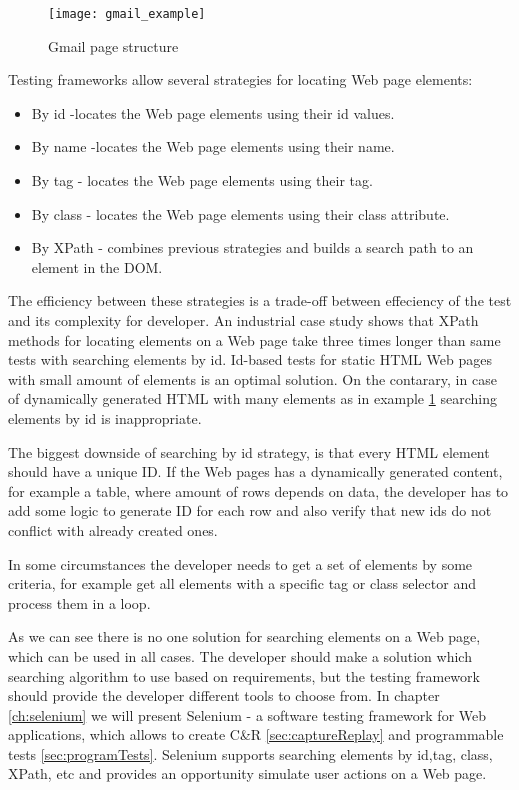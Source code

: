 		\begin{figure}
		\centering
		  \texttt{[image: gmail\_example]}
		  \caption{Gmail page structure}
		  \label{fig:gmailexample}
		\end{figure}
		
		Testing frameworks allow several strategies for locating Web page elements:
		\begin{itemize}
		  \item By id -locates the Web page elements using their id values.
		  \item By name -locates the Web page elements using their name.
		  \item By tag - locates the Web page elements using their tag.
		  \item By class - locates the Web page elements using their class attribute.
		  \item By XPath - combines previous strategies and builds a search
		  path to an element in the DOM.
		\end{itemize}
		
		The efficiency between these strategies is a trade-off between effeciency of
		the test and its complexity for developer. An industrial case study shows that 
		XPath methods for locating elements on a Web page take 
		three times longer than same tests with searching
    elements by id\cite{selenium4}. 
	   Id-based tests for static HTML Web pages with small amount of elements
	   is an optimal solution. On the contarary, in case of dynamically
	   generated HTML with many elements as in example \ref{fig:gmailexample}
	   searching elements by id is inappropriate.
		
		The biggest downside of searching by id strategy, is that every HTML element
		should have a unique ID. If the Web pages has a dynamically generated content,
		for example a table, where amount of rows depends on data, the
		developer has to add some logic to generate ID for each row and also verify
		that new ids do not conflict with already created ones. 
		
		In some circumstances the developer needs to get a set of elements by some
		criteria, for example get all elements with a specific tag or class selector
		and process them in a loop. 
		
		As we can see there is no one solution for searching elements on a Web page,
		which can be used in all cases. The developer should make a solution which
		searching algorithm to use based on requirements, but the testing framework
		should provide the developer different tools to choose from. In chapter
		\ref{ch:selenium} we will present Selenium - a software testing framework
		for Web applications, which allows to create C\&R \ref{sec:captureReplay} and 
    programmable tests \ref{sec:programTests}. Selenium  supports searching
    elements by id,tag, class, XPath, etc and provides an opportunity simulate
    user actions on a Web page.
		

 